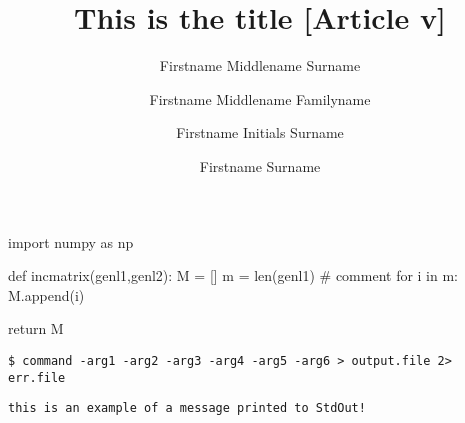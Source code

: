 \documentclass[9pt,tutorial]{livecoms}
\title{This is the title [Article v\versionnumber]}
\author[1*]{Firstname Middlename Surname}
\author[1,2\authfn{1}\authfn{3}]{Firstname Middlename Familyname}
\author[2\authfn{1}\authfn{4}]{Firstname Initials Surname}
\author[2*]{Firstname Surname}
\affil[1]{Institution 1}
\affil[2]{Institution 2}
\begin{document}
\begin{frontmatter}
\maketitle
\end{frontmatter}


\begin{python}
import numpy as np
    
def incmatrix(genl1,genl2):
    M = []
    m = len(genl1)  # comment 
    for i in m:
        M.append(i)
    
    return M
\end{python}

\begin{lstlisting}
$ command -arg1 -arg2 -arg3 -arg4 -arg5 -arg6 > output.file 2> err.file
\end{lstlisting}

\begin{lstlisting}[columns=flexible]
this is an example of a message printed to StdOut!
\end{lstlisting}
\end{document}
